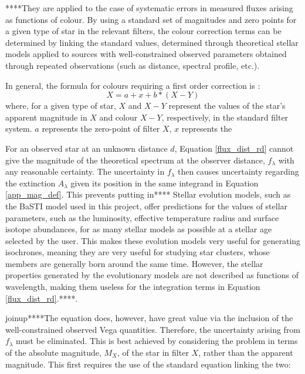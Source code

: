 \documentclass[12pt, a4paper]{report}
\begin{document}
****They are applied to the case of systematic errors in measured fluxes arising as functions of colour. By using a standard set of magnitudes and zero points for a given type of star in the relevant filters, the colour correction terms can be determined by linking the standard values, determined through theoretical stellar models applied to sources with well-constrained observed parameters obtained through repeated observations (such as distance, spectral profile, etc.).




In general, the formula for colours requiring a first order correction is \citep{2000PASA...17..244S}:
\begin{equation}
 X  =  a  +  x  + b * (X-Y)
\label{color_correction_eq}
\end{equation}
where, for a given type of star, $X$ and $X-Y$ represent the values of the star's apparent magnitude in $X$ and colour $X-Y$, respectively, in the standard filter system. $a$ represents the zero-point of filter $X$, $x$ represents the

For an observed star at an unknown distance $d$, Equation \ref{flux_dist_rd} cannot give the magnitude of the theoretical spectrum at the observer distance, $f_{\lambda}$ with any reasonable certainty. The uncertainty in $f_{\lambda}$ then causes uncertainty regarding the extinction $A_{\lambda}$ given its position in the same integrand in Equation \ref{app_mag_def}. This prevents putting in**** Stellar evolution models, such as the BaSTI model used in this project, offer predictions for the values of stellar parameters, such as the luminosity, effective temperature radius and surface isotope abundances, for as many stellar models as possible at a stellar age selected by the user. This makes these evolution models very useful for generating isochrones, meaning they are very useful for studying star clusters, whose members are generally born around the same time. However, the stellar properties generated by the evolutionary models are not described as functions of wavelength, making them useless for the integration terms in Equation \ref{flux_dist_rd}.****. 

joinup****The equation does, however, have great value via the inclusion of the well-constrained observed Vega quantities. Therefore, the uncertainty arising from $f_{\lambda}$ must be eliminated. This is best achieved by considering the problem in terms of the absolute magnitude, $M_{X}$, of the star in filter $X$, rather than the apparent magnitude. This first requires the use of the standard equation linking the two:
\end{document}
